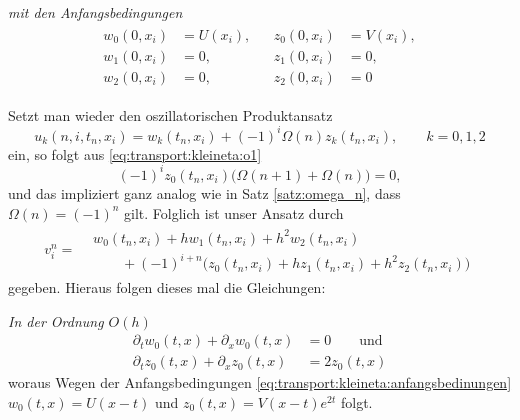 \emph{mit den Anfangsbedingungen}
\begin{align}\label{eq:transport:kleineta:anfangsbedinungen}
\begin{split}
w_0(0, x_i) &= U(x_i),\\
w_1(0, x_i) &= 0,\\
w_2(0, x_i) &= 0,
\end{split}&
\begin{split}
z_0(0, x_i) &= V(x_i),\\
z_1(0, x_i) &= 0,\\
z_2(0, x_i) &= 0
\end{split}
\end{align}

Setzt man wieder den oszillatorischen Produktansatz
\[ u_k(n, i, t_n, x_i) = w_k(t_n, x_i) + (-1)^i \Omega(n) z_k(t_n, x_i), \qquad k = 0,1,2 \]
ein, so folgt aus \eqref{eq:transport:kleineta:o1}
\[ (-1)^i z_0(t_n, x_i) \bigl( \Omega(n+1) + \Omega(n) \bigr) = 0, \]
und das impliziert ganz analog wie in Satz \ref{satz:omega_n}, dass $\Omega(n) = (-1)^n$ gilt.
Folglich ist unser Ansatz durch
\begin{align}
v^n_i = \begin{split}
&w_0(t_n, x_i) + h w_1(t_n, x_i) + h^2 w_2(t_n, x_i)\\
&\qquad + (-1)^{i+n} \bigl( z_0(t_n, x_i) + h z_1(t_n, x_i) + h^2 z_2(t_n, x_i) \bigr)
\end{split}
\end{align}
gegeben. Hieraus folgen dieses mal die Gleichungen:

\vspace{0.4cm}
\noindent \emph{In der Ordnung $O(h)$}
\begin{align*}
\partial_t w_0(t, x) + \partial_x w_0(t, x) &= 0 \qquad \text{und}\\
\partial_t z_0(t, x) + \partial_x z_0(t, x) &= 2 z_0(t, x)
\end{align*}
woraus Wegen der Anfangsbedingungen \eqref{eq:transport:kleineta:anfangsbedinungen} $w_0(t,x) = U(x -t)$ und $z_0(t,x) = V(x - t) e^{2 t}$ folgt.

